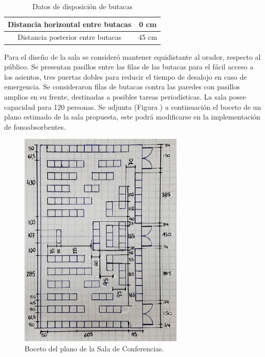 \begin{table}[H]
\setlength\arrayrulewidth{1pt}
    \centering
    \begin{tabular}{|c|c|} \hline
        Distancia horizontal entre butacas & 0 cm  \\ \hline
        Distancia posterior entre butacas  & 45 cm  \\ \hline
    \end{tabular}
    \caption{Datos de disposición de butacas}
    \label{tab:my_label}
\end{table}

\par Para el diseño de la sala se consideró mantener equidistante al orador, respecto al público. Se presentan pasillos entre las filas de las butacas para el fácil acceso a los asientos, tres puertas dobles para reducir el tiempo de desalojo en caso de emergencia. Se consideraron filas de butacas contra las paredes con pasillos amplios en su frente, destinadas a posibles tareas periodísticas. La sala posee capacidad para 120 personas. Se adjunta (Figura ) a continuación el boceto de un plano estimado de la sala propuesta, este podrá modificarse en la implementación de fonoabsorbentes. 


\begin{figure}[H]
	\centering
	\includegraphics[width=0.7\textwidth]{./img/sala_medidas.jpg}
	\caption{Boceto del plano de la Sala de Conferencias.}
	\label{fig:plano}
\end{figure}
